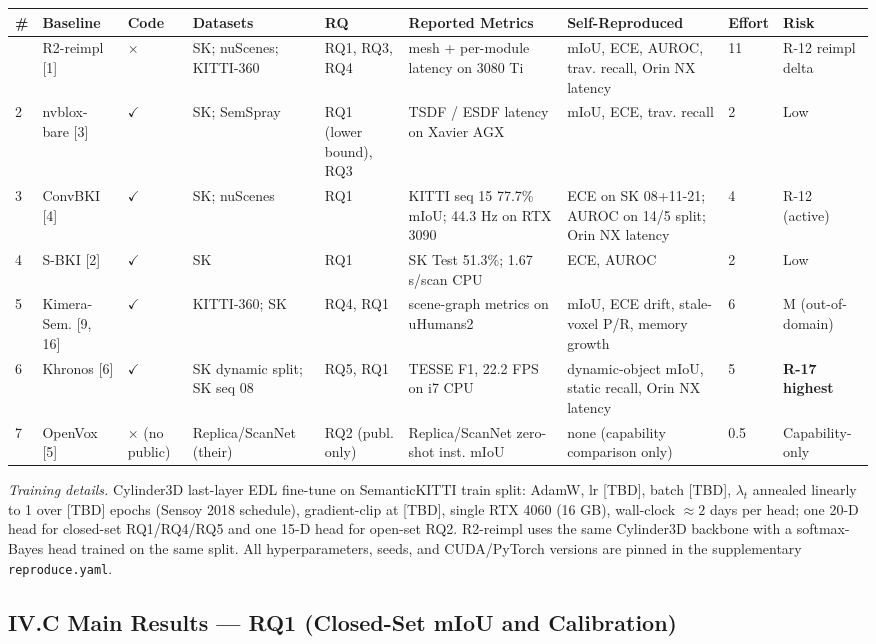 \documentclass[
]{article}
\newcounter{none} %
\begin{document}
{\def\LTcaptype{none} %
\begin{longtable}[]{@{}lllllllll@{}}
\toprule\noalign{}
\# & Baseline & Code & Datasets & RQ & Reported Metrics &
Self-Reproduced & Effort & Risk \\
\midrule\noalign{}
\endhead
\bottomrule\noalign{}
\endlastfoot
1 & R2-reimpl {[}1{]} & \(\times\) & SK; nuScenes; KITTI-360 & RQ1, RQ3,
RQ4 & mesh + per-module latency on 3080 Ti & mIoU, ECE, AUROC, trav.
recall, Orin NX latency & 11 & R-12 reimpl delta \\
2 & nvblox-bare {[}3{]} & \(\checkmark\) & SK; SemSpray & RQ1 (lower
bound), RQ3 & TSDF / ESDF latency on Xavier AGX & mIoU, ECE, trav.
recall & 2 & Low \\
3 & ConvBKI {[}4{]} & \(\checkmark\) & SK; nuScenes & RQ1 & KITTI seq 15
77.7\% mIoU; 44.3 Hz on RTX 3090 & ECE on SK 08+11-21; AUROC on 14/5
split; Orin NX latency & 4 & R-12 (active) \\
4 & S-BKI {[}2{]} & \(\checkmark\) & SK & RQ1 & SK Test 51.3\%; 1.67
s/scan CPU & ECE, AUROC & 2 & Low \\
5 & Kimera-Sem. {[}9, 16{]} & \(\checkmark\) & KITTI-360; SK & RQ4, RQ1
& scene-graph metrics on uHumans2 & mIoU, ECE drift, stale-voxel P/R,
memory growth & 6 & M (out-of-domain) \\
6 & Khronos {[}6{]} & \(\checkmark\) & SK dynamic split; SK seq 08 &
RQ5, RQ1 & TESSE F1, 22.2 FPS on i7 CPU & dynamic-object mIoU, static
recall, Orin NX latency & 5 & \textbf{R-17 highest} \\
7 & OpenVox {[}5{]} & \(\times\) (no public) & Replica/ScanNet (their) &
RQ2 (publ. only) & Replica/ScanNet zero-shot inst. mIoU & none
(capability comparison only) & 0.5 & Capability-only \\
\end{longtable}
}

\emph{Training details.} Cylinder3D last-layer EDL fine-tune on
SemanticKITTI train split: AdamW, lr {[}TBD{]}, batch {[}TBD{]},
\(\lambda_t\) annealed linearly to 1 over {[}TBD{]} epochs (Sensoy 2018
schedule), gradient-clip at {[}TBD{]}, single RTX 4060 (16 GB),
wall-clock \(\approx 2\) days per head; one 20-D head for closed-set
RQ1/RQ4/RQ5 and one 15-D head for open-set RQ2. R2-reimpl uses the same
Cylinder3D backbone with a softmax-Bayes head trained on the same split.
All hyperparameters, seeds, and CUDA/PyTorch versions are pinned in the
supplementary \texttt{reproduce.yaml}.

\subsection{IV.C Main Results --- RQ1 (Closed-Set mIoU and
Calibration)}\label{ivc-main-results--rq1-closed-set-miou-and-calibration}
\end{document}
